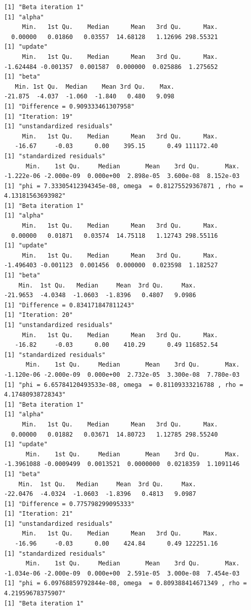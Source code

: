 \documentclass[10pt]{article}
\theoremstyle{definition}
\begin{document}
\begin{itemize}
\begin{verbatim}
[1] "Beta iteration 1"
[1] "alpha"
     Min.   1st Qu.    Median      Mean   3rd Qu.      Max.
  0.00000   0.01860   0.03557  14.68128   1.12696 298.55321
[1] "update"
     Min.   1st Qu.    Median      Mean   3rd Qu.      Max.
-1.624484 -0.001357  0.001587  0.000000  0.025886  1.275652
[1] "beta"
   Min. 1st Qu.  Median    Mean 3rd Qu.    Max.
-21.875  -4.037  -1.060  -1.840   0.480   9.098
[1] "Difference = 0.909333461307958"
[1] "Iteration: 19"
[1] "unstandardized residuals"
     Min.   1st Qu.    Median      Mean   3rd Qu.      Max.
   -16.67     -0.03      0.00    395.15      0.49 111172.40
[1] "standardized residuals"
      Min.    1st Qu.     Median       Mean    3rd Qu.       Max.
-1.222e-06 -2.000e-09  0.000e+00  2.898e-05  3.600e-08  8.152e-03
[1] "phi = 7.33305412394345e-08, omega  = 0.81275529367871 , rho = 4.13181563693982"
[1] "Beta iteration 1"
[1] "alpha"
     Min.   1st Qu.    Median      Mean   3rd Qu.      Max.
  0.00000   0.01871   0.03574  14.75118   1.12743 298.55116
[1] "update"
     Min.   1st Qu.    Median      Mean   3rd Qu.      Max.
-1.496403 -0.001123  0.001456  0.000000  0.023598  1.182527
[1] "beta"
    Min.  1st Qu.   Median     Mean  3rd Qu.     Max.
-21.9653  -4.0348  -1.0603  -1.8396   0.4807   9.0986
[1] "Difference = 0.834171847811243"
[1] "Iteration: 20"
[1] "unstandardized residuals"
     Min.   1st Qu.    Median      Mean   3rd Qu.      Max.
   -16.82     -0.03      0.00    410.29      0.49 116852.54
[1] "standardized residuals"
      Min.    1st Qu.     Median       Mean    3rd Qu.       Max.
-1.120e-06 -2.000e-09  0.000e+00  2.732e-05  3.300e-08  7.780e-03
[1] "phi = 6.65784120493533e-08, omega  = 0.81109333216788 , rho = 4.17480938728343"
[1] "Beta iteration 1"
[1] "alpha"
     Min.   1st Qu.    Median      Mean   3rd Qu.      Max.
  0.00000   0.01882   0.03671  14.80723   1.12785 298.55240
[1] "update"
      Min.    1st Qu.     Median       Mean    3rd Qu.       Max.
-1.3961088 -0.0009499  0.0013521  0.0000000  0.0218359  1.1091146
[1] "beta"
    Min.  1st Qu.   Median     Mean  3rd Qu.     Max.
-22.0476  -4.0324  -1.0603  -1.8396   0.4813   9.0987
[1] "Difference = 0.775798299095333"
[1] "Iteration: 21"
[1] "unstandardized residuals"
     Min.   1st Qu.    Median      Mean   3rd Qu.      Max.
   -16.96     -0.03      0.00    424.84      0.49 122251.16
[1] "standardized residuals"
      Min.    1st Qu.     Median       Mean    3rd Qu.       Max.
-1.034e-06 -2.000e-09  0.000e+00  2.591e-05  3.000e-08  7.454e-03
[1] "phi = 6.09768859792844e-08, omega  = 0.809388414671349 , rho = 4.21959678375907"
[1] "Beta iteration 1"

\end{verbatim}
\end{itemize}
\end{document}
